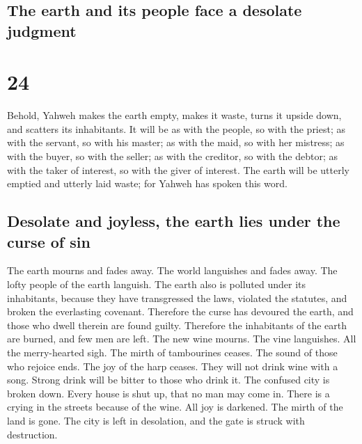 \hypertarget{the-earth-and-its-people-face-a-desolate-judgment}{%
\subsection{The earth and its people face a desolate
judgment}\label{the-earth-and-its-people-face-a-desolate-judgment}}

\hypertarget{section-23}{%
\section{24}\label{section-23}}

 Behold, Yahweh makes the earth empty, makes it waste,
turns it upside down, and scatters its inhabitants.  It
will be as with the people, so with the priest; as with the servant, so
with his master; as with the maid, so with her mistress; as with the
buyer, so with the seller; as with the creditor, so with the debtor; as
with the taker of interest, so with the giver of interest.
 The earth will be utterly emptied and utterly laid waste;
for Yahweh has spoken this word.

\hypertarget{desolate-and-joyless-the-earth-lies-under-the-curse-of-sin}{%
\subsection{Desolate and joyless, the earth lies under the curse of
sin}\label{desolate-and-joyless-the-earth-lies-under-the-curse-of-sin}}

 The earth mourns and fades away. The world languishes and
fades away. The lofty people of the earth languish.  The
earth also is polluted under its inhabitants, because they have
transgressed the laws, violated the statutes, and broken the everlasting
covenant.  Therefore the curse has devoured the earth, and
those who dwell therein are found guilty. Therefore the inhabitants of
the earth are burned, and few men are left.  The new wine
mourns. The vine languishes. All the merry-hearted sigh. 
The mirth of tambourines ceases. The sound of those who rejoice ends.
The joy of the harp ceases.  They will not drink wine with
a song. Strong drink will be bitter to those who drink it.
 The confused city is broken down. Every house is shut
up, that no man may come in.  There is a crying in the
streets because of the wine. All joy is darkened. The mirth of the land
is gone.  The city is left in desolation, and the gate is
struck with destruction.

